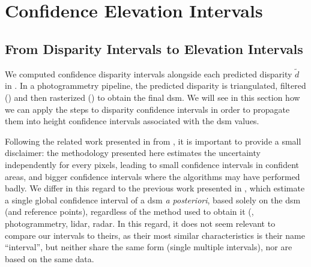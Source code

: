 \chapter{Confidence Elevation Intervals}\label{chap:elevation_intervals}
\section{From Disparity Intervals to Elevation Intervals}\label{sec:elevation_intervals}
We computed confidence disparity intervals alongside each predicted disparity $\tilde{d}$ in . In a photogrammetry pipeline, the predicted disparity is triangulated, filtered () and then rasterized () to obtain the final \acrshort{dsm}. We will see in this section how we can apply the steps to disparity confidence intervals in order to propagate them into height confidence intervals associated with the \acrshort{dsm} values.

Following the related work presented in  from , it is important to provide a small disclaimer: the methodology presented here estimates the uncertainty independently for every pixels, leading to small confidence intervals in confident areas, and bigger confidence intervals where the algorithms may have performed badly. We differ in this regard to the previous work presented in , which estimate a single global confidence interval of a \acrshort{dsm} \textit{a posteriori}, based solely on the \acrshort{dsm} (and reference points), regardless of the method used to obtain it (\ie, photogrammetry, \acrshort{lidar}, \acrshort{radar}. In this regard, it does not seem relevant to compare our intervals to theirs, as their most similar characteristics is their name ``interval'', but neither share the same form (single \vs multiple intervals), nor are based on the same data.

